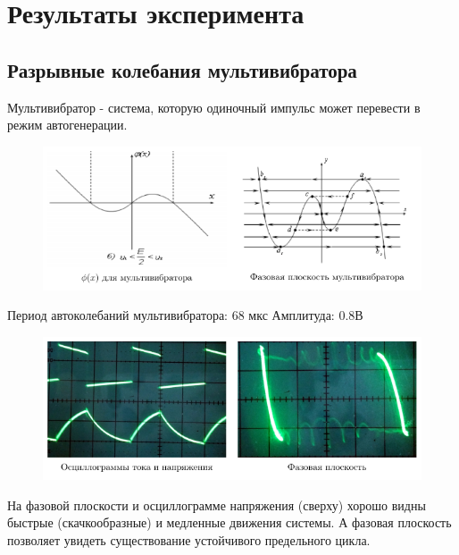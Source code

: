 \documentclass[a4paper,14pt]{extarticle}
\begin{document}
\section{Результаты эксперимента}
\subsection{Разрывные колебания мультивибратора}
Мультивибратор - система, которую одиночный импульс может перевести в режим автогенерации. 
   \begin{figure}[H]
    \centering
       \includegraphics[width=1\textwidth]{plot/ris1}
       \vspace{-1.4em}
     \caption{}
     \label{fig:dummy}
	\end{figure}
Период автоколебаний мультивибратора: $68$ мкс
Амплитуда: $0.8$В
   \begin{figure}[H]
    \centering
       \includegraphics[width=1\textwidth]{plot/multi}
       \vspace{-1.4em}
     \caption{}
     \label{fig:dummy}
	\end{figure}
На фазовой плоскости и осциллограмме напряжения (сверху) хорошо видны быстрые (скачкообразные) и медленные движения системы. А фазовая плоскость позволяет увидеть существование устойчивого предельного цикла.
\end{document}
